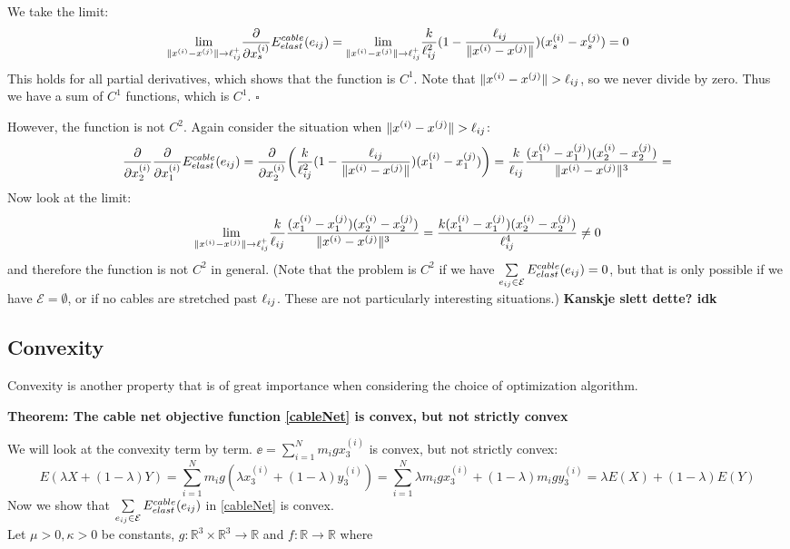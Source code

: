 We take the limit:
\begin{equation}
    \underset{\lVert x^{(i)} - x^{(j)}\rVert \to \ell_{ij} ^+}{\text{lim}} \frac{\partial}{\partial x_s^{(i)}} E^{cable}_{elast}(e_{ij}) =    \underset{\lVert x^{(i)} - x^{(j)}\rVert \to \ell_{ij} ^+}{\text{lim}} \frac{k}{\ell_{ij}^2} (1- \frac{\ell_{ij}}{\lVert x^{(i)} - x^{(j)}\rVert}) (x_s^{(i)} - x_s^{(j)}) = 0
\end{equation}
This holds for all partial derivatives, which shows that the function is $C^1$. Note that $\lVert x^{(i)} - x^{(j)}\rVert>\ell_{ij}$, so we never divide by zero. Thus we have a sum of $C^1$ functions, which is $C^1$. \hfill $\square$ 

However, the function is not $C^2$. Again consider the situation when $\lVert x^{(i)} - x^{(j)}\rVert > \ell_{ij}$:
\begin{equation*}
    \frac{\partial}{\partial x_2^{(i)}} \frac{\partial}{\partial x_1^{(i)}} E^{cable}_{elast}(e_{ij}) = \frac{\partial}{\partial x_2^{(i)}}  \bigg (\frac{k}{\ell_{ij}^2} (1- \frac{\ell_{ij}}{\lVert x^{(i)} - x^{(j)}\rVert}) (x_1^{(i)} - x_1^{(j)}) \bigg) = \frac{k}{\ell_{ij}} \frac{(x_1^{(i)} - x_1^{(j)}) (x_2^{(i)}-x_2^{(j)})}{\lVert x^{(i)} - x^{(j)}\rVert^3} = 
\end{equation*}
Now look at the limit: $$ \underset{\lVert x^{(i)} - x^{(j)}\rVert \to \ell_{ij} ^+}{\text{lim}} \frac{k}{\ell_{ij}}\frac{ (x_1^{(i)} - x_1^{(j)}) (x_2^{(i)}-x_2^{(j)})}{\lVert x^{(i)} - x^{(j)}\rVert^3} = \frac{k (x_1^{(i)} - x_1^{(j)}) (x_2^{(i)}-x_2^{(j)})}{\ell_{ij}^4} \neq 0 $$ and therefore the function is not $C^2$ in general. (Note that the problem is $C^2$ if we have
$\sum\limits_{e_{ij} \in \mathcal{E}} E^{cable}_{elast}(e_{ij}) = 0$, but that is only possible if we have $\mathcal{E} = \emptyset$, or if no cables are stretched past $\ell_{ij}$. These are not particularly interesting situations.)
\textbf{Kanskje slett dette? idk}


\subsection{Convexity}
Convexity is another property that is of great importance when considering the choice of optimization algorithm. 

\textbf{Theorem: The cable net objective function \eqref{cableNet} is convex, but not strictly convex}

We will look at the convexity term by term.
$\ee =\sum_{i=1}^N m_i g x_3^{(i)}$ is convex, but not strictly convex:
\begin{equation*}
    E(\lambda X +(1-\lambda) Y) = \sum_{i=1}^N m_i g (\lambda x_3^{(i)} + (1-\lambda) y_3^{(i)})
    =\sum_{i=1}^N \lambda m_i g x_3^{(i)} + (1-\lambda) m_i g  y_3^{(i)} = \lambda E(X) + (1-\lambda) E(Y)
\end{equation*} 
Now we show that $\sum\limits_{e_{ij} \in \mathcal{E}} E^{cable}_{elast}(e_{ij})$ in \eqref{cableNet} is convex. \\
Let $\mu > 0, \kappa > 0$  be constants, $g: \mathbb{R}^3 \times \mathbb{R}^3 \rightarrow \mathbb{R}$ and $f: \mathbb{R} \rightarrow \mathbb{R}$ where 

